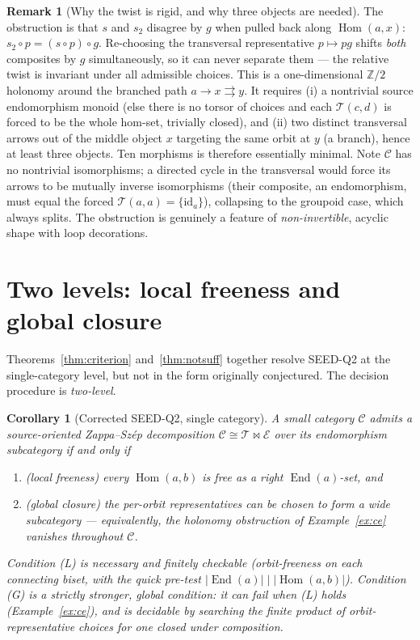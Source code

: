 \documentclass[11pt]{article}
\newtheorem{corollary}[theorem]{Corollary}
\theoremstyle{definition}
\newtheorem{remark}[theorem]{Remark}
\newcommand{\Hom}{\operatorname{Hom}}
\newcommand{\End}{\operatorname{End}}
\newcommand{\id}{\mathrm{id}}
\newcommand{\C}{\mathcal{C}}
\newcommand{\T}{\mathcal{T}}
\newcommand{\E}{\mathcal{E}}
\begin{document}
\begin{remark}[Why the twist is rigid, and why three objects are needed]
The obstruction is that $s$ and $s_2$ disagree by $g$ when pulled back along
$\Hom(a,x)$: $s_2\circ p=(s\circ p)\circ g$. Re-choosing the transversal
representative $p\mapsto pg$ shifts \emph{both} composites by $g$
simultaneously, so it can never separate them --- the relative twist is invariant
under all admissible choices. This is a one-dimensional $\mathbb Z/2$ holonomy
around the branched path $a\to x\rightrightarrows y$. It requires (i) a
nontrivial source endomorphism monoid (else there is no torsor of choices and
each $\T(c,d)$ is forced to be the whole hom-set, trivially closed), and (ii) two
distinct transversal arrows out of the middle object $x$ targeting the same orbit
at $y$ (a branch), hence at least three objects. Ten morphisms is therefore
essentially minimal. Note $\C$ has no nontrivial isomorphisms; a directed cycle
in the transversal would force its arrows to be mutually inverse isomorphisms
(their composite, an endomorphism, must equal the forced $\T(a,a)=\{\id_a\}$),
collapsing to the groupoid case, which always splits. The obstruction is genuinely
a feature of \emph{non-invertible}, acyclic shape with loop decorations.
\end{remark}

\section{Two levels: local freeness and global closure}

Theorems~\ref{thm:criterion} and~\ref{thm:notsuff} together resolve SEED-Q2 at the
single-category level, but not in the form originally conjectured. The decision
procedure is \emph{two-level}.

\begin{corollary}[Corrected SEED-Q2, single category]\label{cor:twolevel}
A small category $\C$ admits a source-oriented Zappa--Sz\'ep decomposition
$\C\cong\T\bowtie\E$ over its endomorphism subcategory if and only if
\begin{enumerate}
\item[\textnormal{(L)}] \emph{(local freeness)} every $\Hom(a,b)$ is free as a
right $\End(a)$-set, \emph{and}
\item[\textnormal{(G)}] \emph{(global closure)} the per-orbit representatives can
be chosen to form a wide subcategory --- equivalently, the holonomy obstruction of
Example~\ref{ex:ce} vanishes throughout $\C$.
\end{enumerate}
Condition \textnormal{(L)} is necessary and finitely checkable (orbit-freeness on
each connecting biset, with the quick pre-test
$\lvert\End(a)\rvert\mid\lvert\Hom(a,b)\rvert$). Condition \textnormal{(G)} is a
strictly stronger, global condition: it can fail when \textnormal{(L)} holds
(Example~\ref{ex:ce}), and is decidable by searching the finite product of
orbit-representative choices for one closed under composition.
\end{corollary}
\end{document}
